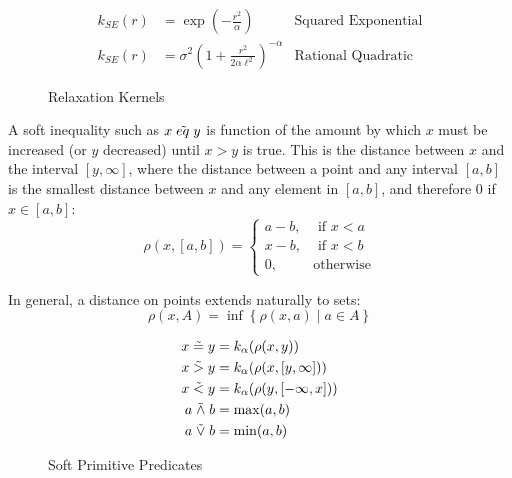 \begin{figure}
\begin{align*}
k_{SE}(r) &= \exp\left(-\frac{r^2}{\alpha}\right) & \text{Squared Exponential}\\
k_{SE}(r) &= \sigma^2\left(1 + \frac{r^2}{2 \alpha \ell^2}\right)^{-\alpha} & \text{Rational Quadratic}
\end{align*}
\caption{Relaxation Kernels}
\label{kernels}
\end{figure}

A soft inequality such as $x \mathrel{\tilde{eq}} y$ is function of the amount by which $x$ must be increased (or $y$ decreased) until $x > y$ is true.
This is the distance between $x$ and the interval $[y, \infty]$, where the distance between a point and any interval $[a, b]$ is the smallest distance between $x$ and any element in $[a, b]$, and therefore 0 if $x \in [a, b]$:
\begin{equation}
\rho(x, [a, b]) =
\begin{cases}
  a - b, & \text{ if } x < a\\
  x - b, & \text{ if } x < b\\
  0,              & \text{otherwise}
\end{cases}
\end{equation}

In general, a distance on points extends naturally to sets:
\begin{equation}
\rho(x, A) = \inf \left\{\rho(x, a) \mid a \in A\right\}
\end{equation}




\begin{figure}\label{softpreds}
  \begin{align*}
x \mathrel{\tilde{=}} y &= k_\alpha(\rho(x, y))\\
x \mathrel{\tilde{>}} y &= k_\alpha(\rho(x, [y, \infty]))\\
x \mathrel{\tilde{<}} y &= k_\alpha(\rho(y, [-\infty, x]))\\
a \mathrel{\tilde{\land}} b &= \max(a, b)\\
a \mathrel{\tilde{\lor}} b &= \min(a, b)
  \end{align*}
\caption{Soft Primitive Predicates}
\end{figure}

